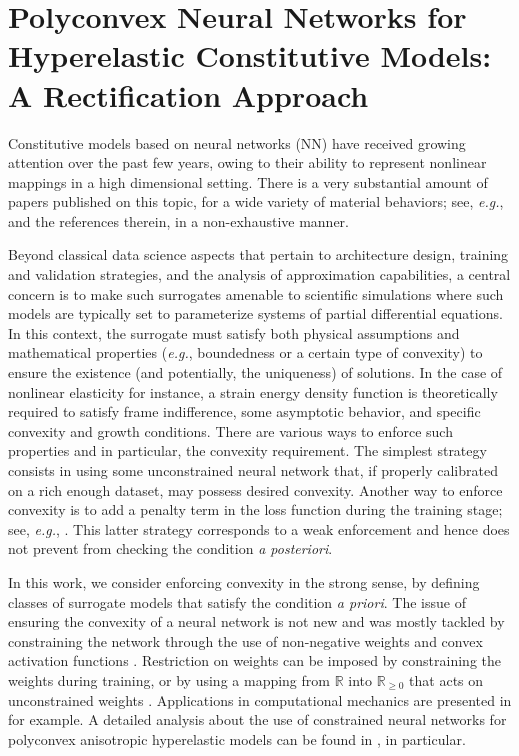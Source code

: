 \chapter{Polyconvex Neural Networks for Hyperelastic Constitutive Models: A Rectification Approach}
\label{chap:polyconvex}

Constitutive models based on neural networks (NN) have received growing attention over the past few years, owing to their ability to represent nonlinear mappings in a high dimensional setting. There is a very substantial amount of papers published on this topic, for a wide variety of material behaviors; see, \textit{e.g.},  \cite{flaschel2021unsupervised,xu2021learning,holzapfel2021predictive,jung2006neural,ghaboussi1998autoprogressive,ghaboussi1998new,hashash2004numerical,furukawa1998implicit,joshi2022bayesian,as2022mechanics,Asad-IJNME,KLEIN2022104703} and the references therein, in a non-exhaustive manner.

Beyond classical data science aspects that pertain to architecture design, training and validation strategies, and the analysis of approximation capabilities, a central concern is to make such surrogates amenable to scientific simulations where such models are typically set to parameterize systems of partial differential equations. In this context, the surrogate must satisfy both physical assumptions and mathematical properties (\textit{e.g.}, boundedness or a certain type of convexity) to ensure the existence (and potentially, the uniqueness) of solutions. 
In the case of nonlinear elasticity for instance, a strain energy density function is theoretically required to satisfy frame indifference, some asymptotic behavior, and specific convexity and growth conditions. There are various ways to enforce such properties and in particular, the convexity requirement. The simplest strategy consists in using some unconstrained neural network that, if properly calibrated on a rich enough dataset, may possess desired convexity. Another way to enforce convexity is to add a penalty term in the loss function during the training stage; see, \textit{e.g.}, \cite{liu2020generic}. This latter strategy corresponds to a weak enforcement and hence does not prevent from checking the condition \textit{a posteriori}. 

In this work, we consider enforcing convexity in the strong sense, by defining classes of surrogate models that satisfy the condition \textit{a priori}. The issue of ensuring the convexity of a neural network is not new and was mostly tackled by constraining the network through the use of non-negative weights and convex activation functions \cite{amos2017input}. Restriction on weights can be imposed by constraining the weights during training, or by using a mapping from $\mathbb{R}$ into $\mathbb{R}_{\geq 0}$ that acts on unconstrained weights \cite{sivaprasad2021curious,Asad-IJNME}. Applications in computational mechanics are presented in \cite{masi2021thermodynamics, as2022mechanics,Asad-IJNME} for example. A detailed analysis about the use of constrained neural networks for polyconvex anisotropic hyperelastic models can be found in \cite{KLEIN2022104703}, in particular.

